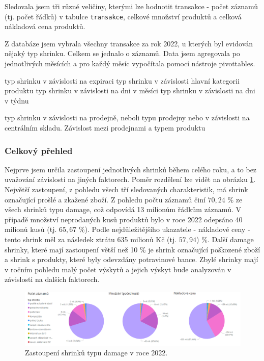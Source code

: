 
Sledovala jsem tři různé veličiny, kterými lze hodnotit transakce - počet záznamů (tj. počet řádků) v tabulce \texttt{transakce}, celkové množství produktů a celková nákladová cena produktů. 

Z databáze jsem vybrala všechny transakce za rok 2022, u kterých byl evidován nějaký typ shrinku. Celkem se jednalo o %
záznamů. Data jsem agregovala po jednotlivých měsících a pro každý měsíc vypočítala pomocí nástroje pivottables.


typ shrinku v závislosti na expiraci
typ shrinku v závislosti hlavní kategorii produktu
typ shrinku v závislosti na dni v měsíci
typ shrinku v závislosti na dni v týdnu

typ shrinku v závislosti na prodejně, neboli typu prodejny nebo v závislosti na centrálním skladu.
Závislost mezi prodejnami a typem produktu


\subsubsection*{Celkový přehled}

Nejprve jsem určila zastoupení jednotlivých shrinků během celého roku, a to bez uvažování závislosti na jiných faktorech. Poměr rozdělení lze vidět na obrázku \ref*{obr:rok:g:celkemD}.
Největší zastoupení, z pohledu všech tří sledovaných charakteristik, má shrink označující prošlé a zkažené zboží. Z pohledu počtu záznamů činí $70{,}24$ \% ze všech shrinků typu damage, což odpovídá 13 milionům řádkům záznamů. V případě množství neprodaných kusů produktů bylo v roce 2022 odepsáno 40 milionů kusů (tj. $65{,}67$  \%). Podle nejdůležitějšího ukazatele - nákladové ceny - tento shrink měl za následek ztrátu 635 milionů Kč (tj. $57{,}94$) \%.
Další damage shrinky, které mají zastoupení větší než 10  \% je shrink označující poškozené zboží a shrink s produkty, které byly odevzdány potravinové bance.
Zbylé shrinky mají v ročním pohledu malý počet výskytů a jejich výskyt bude analyzován v závislosti na dalších faktorech. 

\begin{figure}[hbtp!]
    \centering
    \includegraphics[width=\textwidth]{obrazky/grafy/Graf_celkem-D.png}
    \caption{Zastoupení shrinků typu damage v roce 2022.}
    \label{obr:rok:g:celkemD}
\end{figure}

